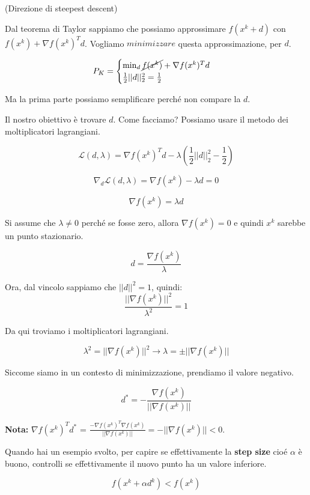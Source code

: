 \begin{definition}
    (Direzione di steepest descent)

    Dal teorema di Taylor sappiamo che possiamo approssimare $f(x^k + d)$ con $f(x^k) + \nabla f(x^k)^T d$. 
    Vogliamo $minimizzare$ questa approssimazione, per $d$.

    $$
    P_K = \begin{cases}
        \min_{d} \cancel{f(x^k)} + \nabla f(x^k)^T d \\
        \frac{1}{2}||d||_2^2 = \frac{1}{2}
    \end{cases}
    $$

    Ma la prima parte possiamo semplificare perché non compare la $d$.

    Il nostro obiettivo è trovare $d$. Come facciamo? Possiamo usare il metodo dei moltiplicatori lagrangiani.

    $$
    \mathcal{L}(d, \lambda) = \nabla f(x^k)^T d - \lambda(\frac{1}{2}||d||_2^2 - \frac{1}{2}) 
    $$

    $$\nabla_{d} \mathcal{L}(d, \lambda) = \nabla f(x^k) - \lambda d = 0$$

    $$\nabla f(x^k) = \lambda d$$

    Si assume che $\lambda \neq 0$ perché se fosse zero, allora $\nabla f(x^k) = 0$ e quindi
    $x^k$ sarebbe un punto stazionario.

    $$d = \frac{\nabla f(x^k)}{\lambda}$$

    Ora, dal vincolo sappiamo che $||d||^2 = 1$, quindi:
    $$\frac{||\nabla f(x^k)||^2}{\lambda^2} = 1$$

    Da qui troviamo i moltiplicatori lagrangiani. 

    $$\lambda^2 = ||\nabla f(x^k)||^2 \rightarrow \lambda = \pm ||\nabla f(x^k)||$$
    
    Siccome siamo in un contesto di minimizzazione, prendiamo il valore negativo.

    $$d^* = -\frac{\nabla f(x^k)}{||\nabla f(x^k)||}$$


    \textbf{Nota:} $\nabla f(x^k)^T d^*$ = $\frac{-\nabla f(x^k)^T \nabla f(x^k)}{||\nabla f(x^k)||} = -||\nabla f(x^k)|| < 0$.

\end{definition}

Quando hai un esempio svolto, per capire se effettivamente la \textbf{step size} cioé $\alpha$ è buono, 
controlli se effettivamente il nuovo punto ha un valore inferiore.

$$ 
f(x^k + \alpha d^k) < f(x^k)
$$

